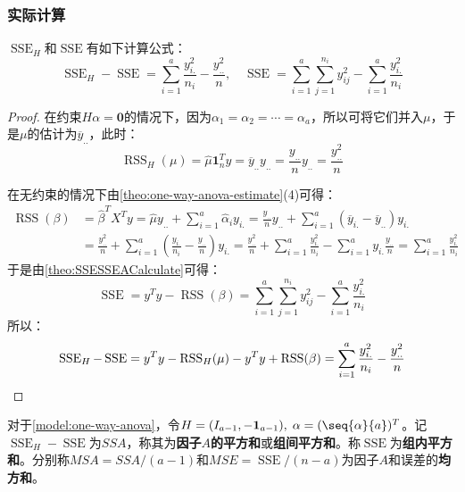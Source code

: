 \subsubsection{实际计算}
\begin{theorem}\label{theo:SSESSEACalculateAOV}
	$\operatorname{SSE}_H$和$\operatorname{SSE}$有如下计算公式：
	\begin{equation*}
		\operatorname{SSE}_H-\operatorname{SSE}=\sum_{i=1}^{a}\frac{y_{i.}^2}{n_i}-\frac{y_{..}^2}{n},\quad \operatorname{SSE}=\sum_{i=1}^{a}\sum_{j=1}^{n_i}y_{ij}^2-\sum_{i=1}^{a}\frac{y_{i.}^2}{n_i}
	\end{equation*}
\end{theorem}
\begin{proof}
	在约束$H\alpha=\mathbf{0}$的情况下，因为$\alpha_1=\alpha_2=\cdots=\alpha_a$，所以可将它们并入$\mu$，于是$\mu$的估计为$\overline{y}_{..}$，此时：
	\begin{equation*}
		\operatorname{RSS}_H(\mu)=\hat{\mu}\mathbf{1}_n^Ty=\overline{y}_{..}y_{..}=\frac{y_{..}}{n}y_{..}=\frac{y_{..}^2}{n}
	\end{equation*}\par
	在无约束的情况下由\cref{theo:one-way-anova-estimate}(4)可得：
	\begin{align*}
		\operatorname{RSS}(\beta)&=\hat{\beta}^TX^Ty=\hat{\mu}y_{..}+\sum_{i=1}^{a}\hat{\alpha}_iy_{i.} =\frac{y_{..}}{n}y_{..}+\sum_{i=1}^{a}(\overline{y}_{i.}-\overline{y}_{..})y_{i.} \\
		&=\frac{y_{..}^2}{n}+\sum_{i=1}^{a}\left(\frac{y_{i.}}{n_i}-\frac{y_{..}}{n}\right)y_{i.} =\frac{y_{..}^2}{n}+\sum_{i=1}^{a}\frac{y_{i.}^2}{n_i}-\sum_{i=1}^{a}y_{i.}\frac{y_{..}}{n}=\sum_{i=1}^{a}\frac{y_{i.}^2}{n_i}
	\end{align*}
	于是由\cref{theo:SSESSEACalculate}可得：
	\begin{equation*}
		\operatorname{SSE}=y^Ty-\operatorname{RSS}(\beta)=\sum_{i=1}^{a}\sum_{j=1}^{n_i}y_{ij}^2-\sum_{i=1}^{a}\frac{y_{i.}^2}{n_i}
	\end{equation*}
	所以：
	\begin{align*}
		\operatorname{SSE}_H-\operatorname{SSE}=y^Ty-\operatorname{RSS}_H(\mu)-y^Ty+\operatorname{RSS}(\beta)=\sum_{i=1}^{a}\frac{y_{i.}^2}{n_i}-\frac{y_{..}^2}{n}\qedhere
	\end{align*}
\end{proof}
\begin{definition}
	对于\cref{model:one-way-anova}，令$H=(I_{a-1},-\mathbf{1}_{a-1}),\;\alpha=(\seq{\alpha}{a})^T$。记$\operatorname{SSE}_H-\operatorname{SSE}$为$SSA$，称其为\textbf{因子$A$的平方和}或\textbf{组间平方和}。称$\operatorname{SSE}$为\textbf{组内平方和}。分别称$MSA=SSA/(a-1)$和$MSE=\operatorname{SSE}/(n-a)$为因子$A$和误差的\textbf{均方和}。
\end{definition}
